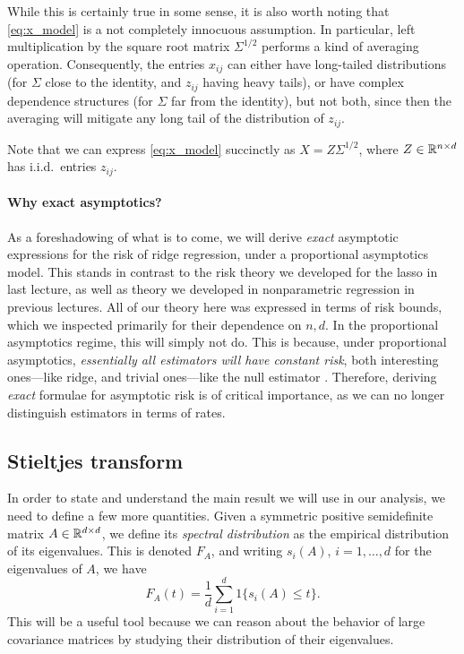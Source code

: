 \documentclass{article}
\begin{document}
While this is certainly true in some sense, it is also worth noting that 
\eqref{eq:x_model} is a not completely innocuous assumption. In particular,
left multiplication by the square root matrix $\Sigma^{1/2}$ performs a kind of
averaging operation. Consequently, the entries $x_{ij}$ can either have
long-tailed distributions (for $\Sigma$ close to the identity, and $z_{ij}$
having heavy tails), or have complex dependence structures (for $\Sigma$ far 
from the identity), but not both, since then the averaging will mitigate any
long tail of the distribution of $z_{ij}$.   

Note that we can express \eqref{eq:x_model} succinctly as $X = Z \Sigma^{1/2}$,
where $Z \in \mathbb{R}^{n \times d}$ has i.i.d.\ entries $z_{ij}$. 

\paragraph{Why exact asymptotics?} 

As a foreshadowing of what is to come, we will derive \emph{exact} asymptotic
expressions for the risk of ridge regression, under a proportional asymptotics 
model. This stands in contrast to the risk theory we developed for the lasso in 
last lecture, as well as theory we developed in nonparametric regression in
previous lectures. All of our theory here was expressed in terms of risk bounds,
which we inspected primarily for their dependence on $n,d$. In the proportional
asymptotics regime, this will simply not do. This is because, under proportional
asymptotics, \emph{essentially all estimators will have constant risk}, both
interesting ones---like ridge, and trivial ones---like the null estimator
. Therefore, deriving \emph{exact} formulae for asymptotic
risk is of critical importance, as we can no longer distinguish estimators in
terms of rates.    

\subsection{Stieltjes transform}

\def\dto{\overset{d}{\to}}
\def\hSigma{\hat\Sigma}

In order to state and understand the main result we will use in our analysis, we
need to define a few more quantities. Given a symmetric positive semidefinite
matrix $A \in \mathbb{R}^{d \times d}$, we define its \emph{spectral distribution} as
the empirical distribution of its eigenvalues. This is denoted $F_A$, and
writing $s_i(A)$, $i=1,\dots,d$ for the eigenvalues of $A$, we have 
\begin{equation}
\label{eq:spectral_dist}
F_A(t) = \frac{1}{d} \sum_{i=1}^d 1\{ s_i(A) \leq t \}. 
\end{equation}
This will be a useful tool because we can reason about the behavior of large
covariance matrices by studying their distribution of their eigenvalues. 
\end{document}
